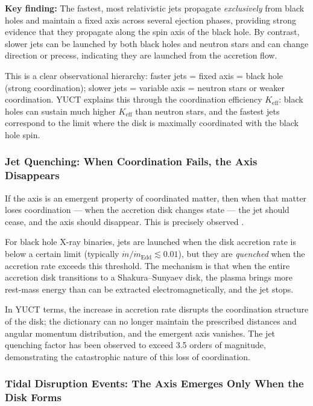 \documentclass[12pt,a4paper]{article}
\begin{document}
	\textbf{Key finding:} The fastest, most relativistic jets propagate \emph{exclusively} from black holes and maintain a fixed axis across several ejection phases, providing strong evidence that they propagate along the spin axis of the black hole. By contrast, slower jets can be launched by both black holes and neutron stars and can change direction or precess, indicating they are launched from the accretion flow.
	
	This is a clear observational hierarchy: faster jets = fixed axis = black hole (strong coordination); slower jets = variable axis = neutron stars or weaker coordination. YUCT explains this through the coordination efficiency \(K_{\mathrm{eff}}\): black holes can sustain much higher \(K_{\mathrm{eff}}\) than neutron stars, and the fastest jets correspond to the limit where the disk is maximally coordinated with the black hole spin.
	
	\subsubsection{Jet Quenching: When Coordination Fails, the Axis Disappears}
	
	If the axis is an emergent property of coordinated matter, then when that matter loses coordination — when the accretion disk changes state — the jet should cease, and the axis should disappear. This is precisely observed \cite{JetQuenching2006,JetQuenching2018}.
	
	For black hole X-ray binaries, jets are launched when the disk accretion rate is below a certain limit (typically \(\dot{m}/\dot{m}_{\text{Edd}} \lesssim 0.01\)), but they are \emph{quenched} when the accretion rate exceeds this threshold. The mechanism is that when the entire accretion disk transitions to a Shakura–Sunyaev disk, the plasma brings more rest-mass energy than can be extracted electromagnetically, and the jet stops.
	
	In YUCT terms, the increase in accretion rate disrupts the coordination structure of the disk; the dictionary can no longer maintain the prescribed distances and angular momentum distribution, and the emergent axis vanishes. The jet quenching factor has been observed to exceed 3.5 orders of magnitude, demonstrating the catastrophic nature of this loss of coordination.
	
	\subsubsection{Tidal Disruption Events: The Axis Emerges Only When the Disk Forms}
	
\end{document}
